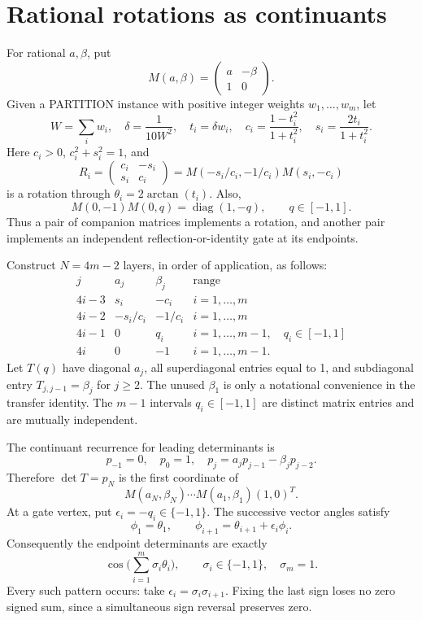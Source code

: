 \documentclass[11pt,a4paper]{article}
\theoremstyle{remark}\newtheorem{remark}[theorem]{Remark}
\newcommand{\diag}{\operatorname{diag}}
\begin{document}
\section{Rational rotations as continuants}
For rational $a,\beta$, put
\[
 M(a,\beta)=\begin{pmatrix}a&-\beta\\1&0\end{pmatrix}.
\]
Given a PARTITION instance with positive integer weights $w_1,\ldots,w_m$, let
\[
 W=\sum_iw_i,\quad\delta=\frac1{10W^2},\quad t_i=\delta w_i,\quad
 c_i=\frac{1-t_i^2}{1+t_i^2},\quad s_i=\frac{2t_i}{1+t_i^2}.
\]
Here $c_i>0$, $c_i^2+s_i^2=1$, and
\[
 R_i=\begin{pmatrix}c_i&-s_i\\s_i&c_i\end{pmatrix}
 =M(-s_i/c_i,-1/c_i)M(s_i,-c_i)
\]
is a rotation through $\theta_i=2\arctan(t_i)$. Also,
\[
 M(0,-1)M(0,q)=\diag(1,-q),\qquad q\in[-1,1].
\]
Thus a pair of companion matrices implements a rotation, and another pair implements an independent reflection-or-identity gate at its endpoints.

Construct $N=4m-2$ layers, in order of application, as follows:
\[
\begin{array}{c|cc|l}
 j&a_j&\beta_j&\text{range}\\\hline
 4i-3&s_i&-c_i&i=1,\ldots,m\\
 4i-2&-s_i/c_i&-1/c_i&i=1,\ldots,m\\
 4i-1&0&q_i&i=1,\ldots,m-1,\quad q_i\in[-1,1]\\
 4i&0&-1&i=1,\ldots,m-1.
\end{array}
\]
Let $T(q)$ have diagonal $a_j$, all superdiagonal entries equal to 1, and subdiagonal entry $T_{j,j-1}=\beta_j$ for $j\ge2$. The unused $\beta_1$ is only a notational convenience in the transfer identity. The $m-1$ intervals $q_i\in[-1,1]$ are distinct matrix entries and are mutually independent.

The continuant recurrence for leading determinants is
\[
 p_{-1}=0,\quad p_0=1,\quad p_j=a_jp_{j-1}-\beta_jp_{j-2}.
\]
Therefore $\det T=p_N$ is the first coordinate of
\[
 M(a_N,\beta_N)\cdots M(a_1,\beta_1)(1,0)^T.
\]
At a gate vertex, put $\epsilon_i=-q_i\in\{-1,1\}$. The successive vector angles satisfy
\[
 \phi_1=\theta_1,\qquad \phi_{i+1}=\theta_{i+1}+\epsilon_i\phi_i.
\]
Consequently the endpoint determinants are exactly
\begin{equation}\label{eq:cos}
 \cos\Big(\sum_{i=1}^m\sigma_i\theta_i\Big),
 \qquad \sigma_i\in\{-1,1\},\quad\sigma_m=1.
\end{equation}
Every such pattern occurs: take $\epsilon_i=\sigma_i\sigma_{i+1}$. Fixing the last sign loses no zero signed sum, since a simultaneous sign reversal preserves zero.
\end{document}
